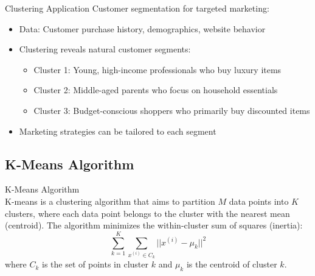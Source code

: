 \begin{example}{Clustering Application}
Customer segmentation for targeted marketing:
\begin{itemize}
    \item Data: Customer purchase history, demographics, website behavior
    \item Clustering reveals natural customer segments:
    \begin{itemize}
        \item Cluster 1: Young, high-income professionals who buy luxury items
        \item Cluster 2: Middle-aged parents who focus on household essentials
        \item Cluster 3: Budget-conscious shoppers who primarily buy discounted items
    \end{itemize}
    \item Marketing strategies can be tailored to each segment
\end{itemize}
\end{example}

\subsection{K-Means Algorithm}

\begin{definition}{K-Means Algorithm}\\
K-means is a clustering algorithm that aims to partition $M$ data points into $K$ clusters, where each data point belongs to the cluster with the nearest mean (centroid). The algorithm minimizes the within-cluster sum of squares (inertia):
\[\sum_{k=1}^{K} \sum_{x^{(i)} \in C_k} ||x^{(i)} - \mu_k||^2\]
where $C_k$ is the set of points in cluster $k$ and $\mu_k$ is the centroid of cluster $k$.
\end{definition}

